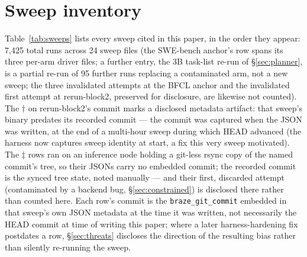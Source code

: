 \documentclass[smallcondensed,natbib]{svjour3}
\begin{document}



\appendix
\section{Sweep inventory}\label{app:sweeps}

Table~\ref{tab:sweeps} lists every sweep cited in this paper, in the
order they appear: 7{,}425 total runs across 24 sweep files (the
SWE-bench anchor's row spans its three per-arm driver files; a
further entry, the 3B task-list re-run of \S\ref{sec:planner}, is a
partial re-run of 95 further runs replacing a contaminated arm, not a
new sweep; the three invalidated attempts at the BFCL anchor and the
invalidated first attempt at rerun-block2, preserved for disclosure,
are likewise not counted). The $\dagger$ on rerun-block2's commit
marks a disclosed metadata artifact: that sweep's binary predates its
recorded commit --- the commit was captured when the JSON was written,
at the end of a multi-hour sweep during which HEAD advanced (the
harness now captures sweep identity at start, a fix this very sweep
motivated). The $\ddagger$ rows ran on an inference node holding a
git-less rsync copy of the named commit's tree, so their JSONs carry no
embedded commit; the recorded commit is the synced tree state, noted
manually --- and their first, discarded attempt (contaminated by a
backend bug, \S\ref{sec:constrained}) is disclosed there rather than
counted here. Each
row's commit is the \texttt{braze\_git\_commit} embedded in that
sweep's own JSON metadata at the time it was written, not necessarily
the HEAD commit at time of writing this paper; where a later
harness-hardening fix postdates a row, \S\ref{sec:threats} discloses
the direction of the resulting bias rather than silently re-running the
sweep.
\end{document}
